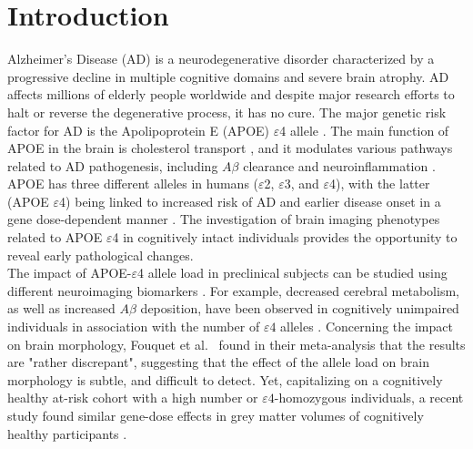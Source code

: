 
\section{Introduction}
\label{sec:introduction}
Alzheimer's Disease (AD) is a neurodegenerative disorder characterized by a progressive decline in multiple cognitive domains and severe brain atrophy. AD affects millions of elderly people worldwide \cite{AlzheimersAssociation} and despite major research efforts to halt or reverse the degenerative process, it has no cure. The major genetic risk factor for AD is the Apolipoprotein E (APOE) $\varepsilon$4 allele \cite{Saunders1993}. The main function of APOE in the brain is cholesterol transport \cite{Saunders1993}, and it modulates various pathways related to AD pathogenesis, including $A\beta$ clearance and neuroinflammation \cite{Zhao2018}. APOE has three different alleles in humans ($\varepsilon$2, $\varepsilon$3, and $\varepsilon$4), with the latter (APOE $\varepsilon$4) being linked to increased risk of AD and earlier disease onset in a gene dose-dependent manner \cite{Liu2013a}. The investigation of brain imaging phenotypes related to APOE $\varepsilon$4 in cognitively intact individuals provides the opportunity to reveal early pathological changes. \\

The impact of APOE-$\varepsilon$4 allele load in preclinical subjects can be studied using different neuroimaging biomarkers \cite{Chetelat2013}. For example, decreased cerebral metabolism, as well as increased $A\beta$ deposition, have been observed in cognitively unimpaired individuals in association with the number of $\varepsilon4$ alleles \cite{Reiman2005,Reiman2009}. Concerning the impact on brain morphology, Fouquet et al.\ \cite{Fouquet2014} found in their meta-analysis that the results are "rather discrepant", suggesting that the effect of the allele load on brain morphology is subtle, and difficult to detect. Yet, capitalizing on a cognitively healthy at-risk cohort with a high number or $\varepsilon4$-homozygous individuals, a recent study found similar gene-dose effects in grey matter volumes of cognitively healthy participants \cite{Cacciaglia2018}. \\

